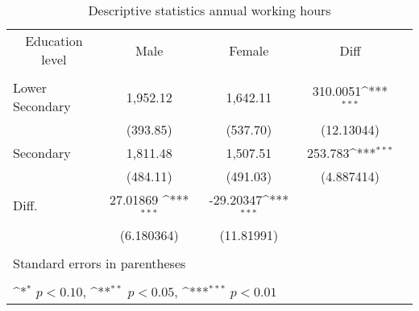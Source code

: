 \begin{table}[htbp]\centering
    \def\sym#1{\ifmmode^{#1}\else\(^{#1}\)\fi}
    \caption{\label{desc-table1b}Descriptive statistics annual working hours}
    \begin{tabular}{l*{4}{c}}
        \hline
        \multicolumn{1}{c}{Education level}   &\multicolumn{1}{c}{Male}&\multicolumn{1}{c}{Female}&\multicolumn{1}{c}{Diff}\\
        \\
        \hline
            Lower Secondary & 1,952.12      & 1,642.11& 310.0051\sym{***}  \\
                            & (393.85)      & (537.70)& (12.13044)  \\
            Secondary       &  1,811.48     & 1,507.51& 253.783\sym{***}      \\
                            & (484.11)      & (491.03)& (4.887414)    \\
            Diff.           &       27.01869 \sym{***}   & -29.20347\sym{***}\\
                            &       (6.180364)  &   (11.81991)  \\
        \\                    
        \hline
        \multicolumn{3}{l}{\footnotesize Standard errors in parentheses}\\
        \multicolumn{3}{l}{\footnotesize }\\
        \multicolumn{3}{l}{\footnotesize \sym{*} \(p<0.10\), \sym{**} \(p<0.05\), \sym{***} \(p<0.01\)}\\


    \end{tabular}
\end{table}
